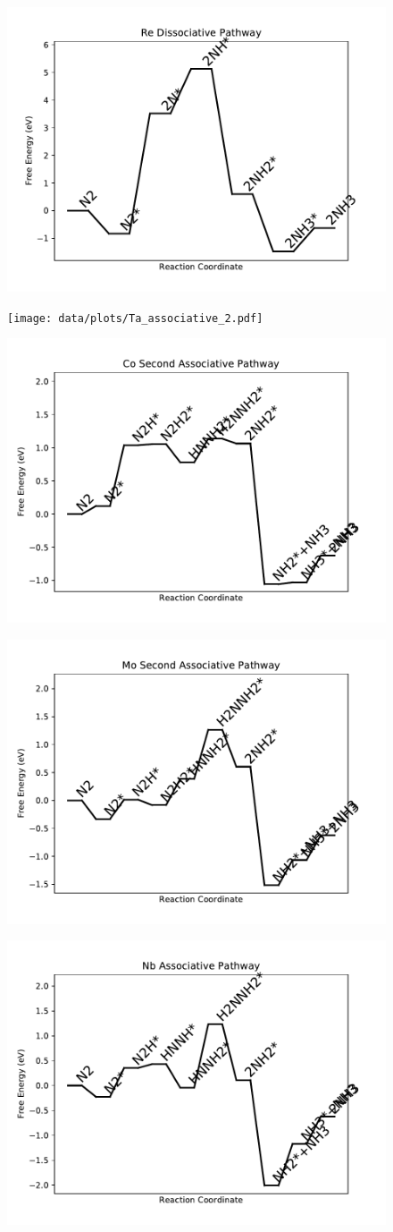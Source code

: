 \documentclass[journal=jacsat,manuscript=article]{achemso}
\begin{document}
\begin{figure}
\includegraphics[width=0.5\linewidth]{data/plots/Re_dissociative.pdf}
\label{fig:Re_dissociative}
\end{figure}

\begin{figure}
\texttt{[image: data/plots/Ta\_associative\_2.pdf]}
\label{fig:Ta_associative_2}
\end{figure}

\begin{figure}
\includegraphics[width=0.5\linewidth]{data/plots/Co_associative_2.pdf}
\label{fig:Co_associative_2}
\end{figure}

\begin{figure}
\includegraphics[width=0.5\linewidth]{data/plots/Mo_associative_2.pdf}
\label{fig:Mo_associative_2}
\end{figure}

\begin{figure}
\includegraphics[width=0.5\linewidth]{data/plots/Nb_associative.pdf}
\label{fig:Nb_associative}
\end{figure}
\end{document}
